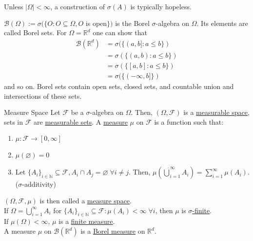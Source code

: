 \documentclass{article}
\begin{document}
	\begin{myrem}{}{}
		Unless $|\Omega|<\infty$, a construction of $\sigma(A)$ is typically hopeless.
	\end{myrem}
	
	\begin{myex}{}{}
		$\mathcal{B}(\Omega):=\sigma(\{O : O\subseteq\Omega, O$ is open$\})$ is the Borel $\sigma$-algebra on $\Omega$. Its elements are called Borel sets. For $\Omega=\mathbb{R}^d$ one can show that
		\begin{align*}
			\mathcal{B}(\mathbb{R}^d)&=\sigma(\{(a, b] : a\leq b\})\\
			&=\sigma(\{(a, b) : a\leq b\})\\
			&=\sigma(\{[a, b] : a\leq b\})\\
			&=\sigma(\{(-\infty, b]\})
		\end{align*}
		and so on. Borel sets contain open sets, closed sets, and countable union and intersections of these sets.
	\end{myex}
	
	\begin{mydef}{Measure Space}{}
			Let $\mathcal{F}$ be a $\sigma$-algebra on $\Omega$. Then, $(\Omega, \mathcal{F})$ is a \underline{measurable space}, sets in $\mathcal{F}$ are \underline{measurable sets}. A \underline{measure} $\mu$ on $\mathcal{F}$ is a function such that:
			\begin{enumerate}[label=(\roman*)]
				\item $\mu : \mathcal{F}\rightarrow [0, \infty]$
				\item $\mu(\varnothing)=0$
				\item Let $\{A_i\}_{i\in\mathbb{N}}\subseteq\mathcal{F}, A_i\cap A_j=\varnothing\;\forall i\neq j$. Then, $\mu(\dot\bigcup_{i=1}^{\infty}A_i)=\sum_{i=1}^{\infty}\mu(A_i)$. ($\sigma$-additivity)
			\end{enumerate}
			
			$(\Omega, \mathcal{F}, \mu)$ is then called a \underline{measure space}.\\
			
			If $\Omega=\bigcup_{i=1}^{\infty}A_i$ for $\{A_i\}_{i\in\mathbb{N}}\subseteq\mathcal{F}: \mu(A_i)<\infty\;\forall i$, then $\mu$ is \underline{$\sigma$-finite}.\\
			
			If $\mu(\Omega)<\infty$, $\mu$ is a \underline{finite measure}.\\
			
			A measure $\mu$ on $\mathcal{B}(\mathbb{R}^d)$ is a \underline{Borel measure} on $\mathbb{R}^d$.
	\end{mydef}
	
\end{document}
